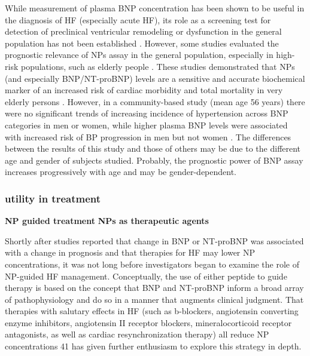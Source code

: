 \documentclass[14pt,a4paper,onecolumn]{extarticle}
\begin{document}
While measurement of plasma BNP concentration has been shown to be useful in the diagnosis of HF (especially acute HF), its role as a screening test for detection of preclinical ventricular remodeling or dysfunction in the general population has not been established \citep{bib35} \citep{bib3246} \citep{bib3247}. However, some studies evaluated the prognostic relevance of NPs assay in the general population, especially in high-risk populations, such as elderly people \citep{bib316} \citep{bib3187} \citep{bib3224} \citep{bib3244} \citep{bib3245} \citep{bib3246} \citep{bib3247} \citep{bib3248}. These studies demonstrated that NPs (and especially BNP/NT-proBNP) levels are a sensitive and accurate biochemical marker of an increased risk of cardiac morbidity and total mortality in very elderly persons \citep{bib316} \citep{bib3147} \citep{bib3188} \citep{bib3227} \citep{bib3248} \citep{bib3249}. However, in a community-based study (mean age 56 years) there were no significant trends of increasing incidence of hypertension across BNP categories in men or women, while higher plasma BNP levels were associated with increased risk of BP progression in men but not women \citep{bib3250}. The differences between the results of this study \citep{bib3250} and those of others \citep{bib316} \citep{bib3185} \citep{bib3227} \citep{bib3248} \citep{bib3249} may be due to the different age and gender of subjects studied. Probably, the prognostic power of BNP assay increases progressively with age and may be gender-dependent.

\clearpage
\subsubsection{utility in treatment}
	\textbf{NP guided treatment}
	\textbf{NPs as therapeutic agents}

Shortly after studies reported that change in BNP or NT-proBNP was associated with a change in prognosis and that therapies for HF may lower NP concentrations, it was not long before investigators began to examine the role of NP-guided HF management. Conceptually, the use of either peptide to guide therapy is based on the concept that BNP and NT-proBNP inform a broad array of pathophysiology and do so in a manner that augments clinical judgment. That therapies with salutary effects in HF (such as b-blockers, angiotensin converting enzyme inhibitors, angiotensin II receptor blockers, mineralocorticoid receptor antagonists, as well as cardiac resynchronization therapy) all reduce NP concentrations 41 has given further enthusiasm to explore this strategy in depth. \citep{Gaggin2013}
\end{document}
